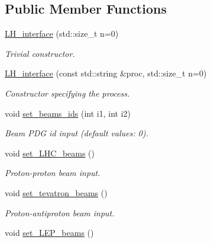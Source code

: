 \subsection*{Public Member Functions}
\begin{DoxyCompactItemize}
\item 
\hyperlink{a00326_a5cb39be90d6edeec70a0c78327b1cec8}{L\+H\+\_\+interface} (std\+::size\+\_\+t n=0)
\begin{DoxyCompactList}\small\item\em Trivial constructor. \end{DoxyCompactList}\item 
\hyperlink{a00326_aa0b7c09c288d4823915af9032ad92a82}{L\+H\+\_\+interface} (const std\+::string \&proc, std\+::size\+\_\+t n=0)
\begin{DoxyCompactList}\small\item\em Constructor specifying the process. \end{DoxyCompactList}\item 
\hypertarget{a00326_af0b374043930699a78a0dec0c77998cf}{}void \hyperlink{a00326_af0b374043930699a78a0dec0c77998cf}{set\+\_\+beams\+\_\+ids} (int i1, int i2)\label{a00326_af0b374043930699a78a0dec0c77998cf}

\begin{DoxyCompactList}\small\item\em Beam P\+D\+G id input (default values\+: 0). \end{DoxyCompactList}\item 
\hypertarget{a00326_a385a610b35ae425024a6727eef94f000}{}void \hyperlink{a00326_a385a610b35ae425024a6727eef94f000}{set\+\_\+\+L\+H\+C\+\_\+beams} ()\label{a00326_a385a610b35ae425024a6727eef94f000}

\begin{DoxyCompactList}\small\item\em Proton-\/proton beam input. \end{DoxyCompactList}\item 
\hypertarget{a00326_afaf2108e359fb46a83a5d743fb1ff36e}{}void \hyperlink{a00326_afaf2108e359fb46a83a5d743fb1ff36e}{set\+\_\+tevatron\+\_\+beams} ()\label{a00326_afaf2108e359fb46a83a5d743fb1ff36e}

\begin{DoxyCompactList}\small\item\em Proton-\/antiproton beam input. \end{DoxyCompactList}\item 
\hypertarget{a00326_a3b34726638267a141d17d464f5228740}{}void \hyperlink{a00326_a3b34726638267a141d17d464f5228740}{set\+\_\+\+L\+E\+P\+\_\+beams} ()\label{a00326_a3b34726638267a141d17d464f5228740}


\end{DoxyCompactItemize}
